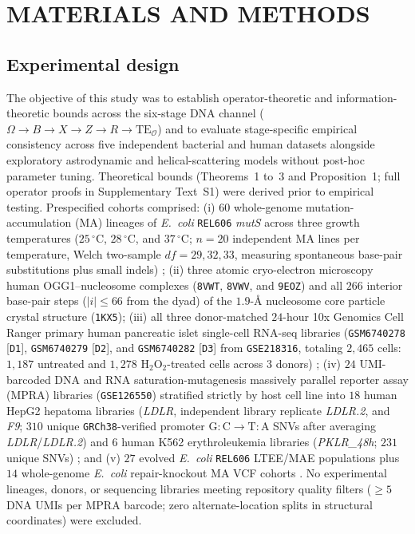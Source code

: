 \documentclass[10pt,letterpaper]{article}
\theoremstyle{plain}
\theoremstyle{definition}
\begin{document}
\section*{MATERIALS AND METHODS}

\subsection*{Experimental design}

The objective of this study was to establish operator-theoretic and information-theoretic bounds across the six-stage DNA channel ($\Omega \to B \to X \to Z \to R \to \mathrm{TE}_{\mathcal{O}}$) and to evaluate stage-specific empirical consistency across five independent bacterial and human datasets alongside exploratory astrodynamic and helical-scattering models without post-hoc parameter tuning. Theoretical bounds (Theorems~1 to~3 and Proposition~1; full operator proofs in Supplementary Text~S1) were derived prior to empirical testing. Prespecified cohorts comprised: (i) $60$ whole-genome mutation-accumulation (MA) lineages of \emph{E.\ coli} \texttt{REL606} \emph{mutS} across three growth temperatures ($25\,^\circ\mathrm{C}$, $28\,^\circ\mathrm{C}$, and $37\,^\circ\mathrm{C}$; $n = 20$ independent MA lines per temperature, Welch two-sample $df = 29, 32, 33$, measuring spontaneous base-pair substitutions plus small indels) \cite{chu2018bmcevol}; (ii) three atomic cryo-electron microscopy human OGG1--nucleosome complexes (\texttt{8VWT}, \texttt{8VWV}, and \texttt{9EOZ}) \cite{ren2024natcommun} and all $266$ interior base-pair steps ($|i| \le 66$ from the dyad) of the $1.9$-$\text{\AA}$ nucleosome core particle crystal structure (\texttt{1KX5}); (iii) all three donor-matched $24$-hour 10x Genomics Cell Ranger primary human pancreatic islet single-cell RNA-seq libraries (\texttt{GSM6740278} [\texttt{D1}], \texttt{GSM6740279} [\texttt{D2}], and \texttt{GSM6740282} [\texttt{D3}] from \texttt{GSE218316}, totaling $2{,}465$ cells: $1{,}187$ untreated and $1{,}278$ $\mathrm{H_2O_2}$-treated cells across $3$ donors) \cite{thomaidou2023diabetologia}; (iv) $24$ UMI-barcoded DNA and RNA saturation-mutagenesis massively parallel reporter assay (MPRA) libraries (\texttt{GSE126550}) stratified strictly by host cell line into $18$ human HepG2 hepatoma libraries (\emph{LDLR}, independent library replicate \emph{LDLR.2}, and \emph{F9}; $310$ unique \texttt{GRCh38}-verified promoter $\mathrm{G{:}C \to T{:}A}$ SNVs after averaging \emph{LDLR}/\emph{LDLR.2}) and $6$ human K562 erythroleukemia libraries (\emph{PKLR\_48h}; $231$ unique SNVs) \cite{kircher2019natcommun}; and (v) $27$ evolved \emph{E.\ coli} \texttt{REL606} LTEE/MAE populations \cite{tenaillon2016nature} plus $14$ whole-genome \emph{E.\ coli} repair-knockout MA VCF cohorts \cite{foster2015pnas,garushyants2024gbe}. No experimental lineages, donors, or sequencing libraries meeting repository quality filters ($\ge 5$ DNA UMIs per MPRA barcode; zero alternate-location splits in structural coordinates) were excluded.
\end{document}
